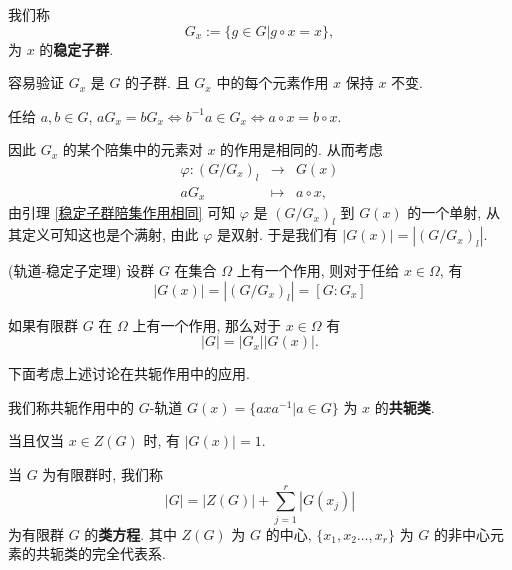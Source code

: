 \begin{definition}\label{稳定子群}
	我们称 $$G_x:=\{g\in G|g\circ x=x\},$$ 为 $x$ 的\textbf{稳定子群}.

	容易验证 $G_x$ 是 $G$ 的子群. 且 $G_x$ 中的每个元素作用 $x$ 保持 $x$ 不变.
\end{definition}

\begin{lemma}\label{稳定子群陪集作用相同}
	任给 $a,b\in G$, $aG_x=bG_x\Leftrightarrow b^{-1}a\in G_x\Leftrightarrow a\circ x=b\circ x$.
\end{lemma}

因此 $G_x$ 的某个陪集中的元素对 $x$ 的作用是相同的. 从而考虑
$$
\begin{array}{rcl}
	\varphi:(G/G_x)_l & \to & G(x)\\
	aG_x & \mapsto & a\circ x,
\end{array}
$$
由引理 \ref{稳定子群陪集作用相同} 可知 $\varphi$ 是 $(G/G_x)_l$ 到 $G(x)$ 的一个单射, 从其定义可知这也是个满射, 由此 $\varphi$ 是双射. 于是我们有 $|G(x)|=|(G/G_x)_l|$.

\begin{theorem}\label{轨道-稳定子定理}(轨道-稳定子定理)
	设群 $G$ 在集合 $\Omega$ 上有一个作用, 则对于任给 $x\in\Omega$, 有
	\begin{equation}
		|G(x)|=|(G/G_x)_l|=[G:G_x]
	\end{equation}
\end{theorem}

\begin{corollary}
	如果有限群 $G$ 在 $\Omega$ 上有一个作用, 那么对于 $x\in \Omega$ 有 $$|G|=|G_x||G(x)|.$$
\end{corollary}

下面考虑上述讨论在共轭作用中的应用.

\begin{definition}\label{共轭类}
	我们称共轭作用中的 $G$-轨道 $G(x)=\{axa^{-1}|a\in G\}$ 为 $x$ 的\textbf{共轭类}.
\end{definition}

当且仅当 $x\in Z(G)$ 时, 有 $|G(x)|=1$.

\begin{definition}\label{类方程}
	当 $G$ 为有限群时, 我们称
	\begin{equation}
		|G|=|Z(G)|+\sum\limits_{j=1}^r|G(x_j)|
	\end{equation}
	为有限群 $G$ 的\textbf{类方程}. 其中 $Z(G)$ 为 $G$ 的中心, $\{x_1,x_2\ldots,x_r\}$ 为 $G$ 的非中心元素的共轭类的完全代表系.
\end{definition}

